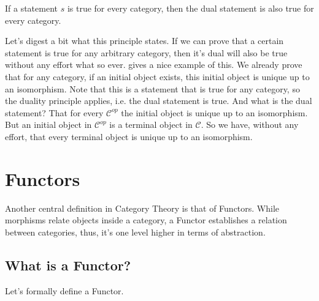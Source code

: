\begin{definition}
  If a statement $s$ is true for every category, then the dual statement is also true for every
  category.
\end{definition}
Let's digest a bit what this principle states. If we can prove that a certain statement is
true for any arbitrary category, then it's dual will also be true without any effort what so ever.
\citet{roman2017introduction} gives a nice example of this. We already prove that for any
category, if an initial object exists, this initial object is unique up to an isomorphism.
Note that this is a statement that is true for any category, so the duality principle applies,
i.e. the dual statement is true. And what is the dual statement? That for every $\mathcal C^{op}$
the initial object is unique up to an isomorphism. But an initial object in $\mathcal C^{op}$
is a terminal object in $\mathcal C$. So we have, without any effort, that every terminal
object is unique up to an isomorphism.


\section{Functors}
Another central definition in Category Theory is that of Functors.
While morphisms relate objects inside a category, a Functor
establishes a relation between categories, thus, it's one level
higher in terms of abstraction.


\subsection{What is a Functor?}

Let's formally define a Functor.


